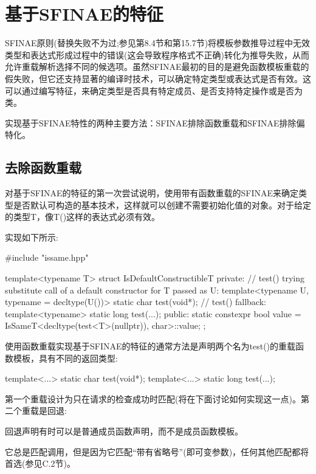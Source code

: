 \section{基于SFINAE的特征}

SFINAE原则(替换失败不为过;参见第8.4节和第15.7节)将模板参数推导过程中无效类型和表达式形成过程中的错误(这会导致程序格式不正确)转化为推导失败，从而允许重载解析选择不同的候选项。虽然SFINAE最初的目的是避免函数模板重载的假失败，但它还支持显著的编译时技术，可以确定特定类型或表达式是否有效。这可以通过编写特征，来确定类型是否具有特定成员、是否支持特定操作或是否为类。

实现基于SFINAE特性的两种主要方法：SFINAE排除函数重载和SFINAE排除偏特化。

\subsection{去除函数重载}

对基于SFINAE的特征的第一次尝试说明，使用带有函数重载的SFINAE来确定类型是否默认可构造的基本技术，这样就可以创建不需要初始化值的对象。对于给定的类型T，像T()这样的表达式必须有效。

实现如下所示:

\begin{cpp}
#include "issame.hpp"

template<typename T>
struct IsDefaultConstructibleT {
	private:
	// test() trying substitute call of a default constructor for T passed as U:
	template<typename U, typename = decltype(U())>
		static char test(void*);
	// test() fallback:
	template<typename>
		static long test(...);
	public:
	static constexpr bool value
		= IsSameT<decltype(test<T>(nullptr)), char>::value;
};
\end{cpp}

使用函数重载实现基于SFINAE的特征的通常方法是声明两个名为test()的重载函数模板，具有不同的返回类型:

\begin{cpp}
template<...> static char test(void*);
template<...> static long test(...);
\end{cpp}

第一个重载设计为只在请求的检查成功时匹配(将在下面讨论如何实现这一点)。第二个重载是回退:

\begin{notice}
回退声明有时可以是普通成员函数声明，而不是成员函数模板。
\end{notice}

它总是匹配调用，但是因为它匹配“带有省略号”(即可变参数)，任何其他匹配都将首选(参见C.2节)。

